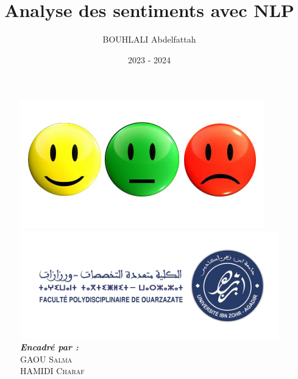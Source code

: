 \documentclass[10pt,hyperref={colorlinks,citecolor=blue,urlcolor=peking_blue,linkcolor=}]{beamer}
\author[BOUHLALI Abdelfattah]{BOUHLALI Abdelfattah}
\title{Analyse des sentiments avec NLP}
\subtitle{}
\institute{Master Mathématiques Appliquées pour la Science des Données}
\date{2023 - 2024}
\theoremstyle{plain}
\newif\ifplacelogo %
\begin{document}
{
\begin{frame}
    \titlepage
    \begin{figure}[htpb]
        \begin{center}
        
            \includegraphics[width=0.2\linewidth]{Figures/imogies.jpg}\\
            
            \includegraphics[width=0.3\linewidth]{Figures/fpo_logo.png} \\
            
            \emph{\textbf{Encadré par :}}\\ 
            \textsc{GAOU Salma} \\
            \textsc{HAMIDI Charaf}
            
        \end{center}
    \end{figure}
\end{frame}
}

\placelogofalse












\end{document}
